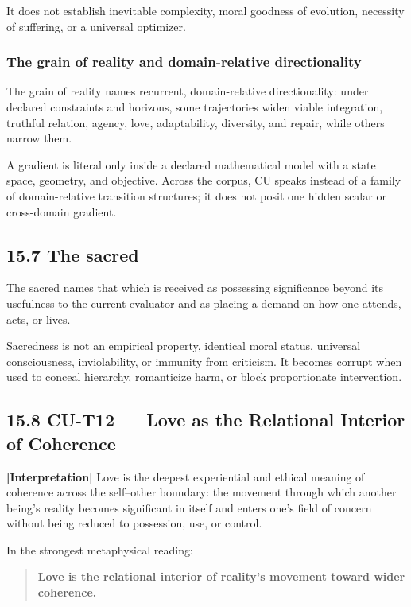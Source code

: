 \documentclass[
  11pt,
]{article}
\begin{document}
It does not establish inevitable complexity, moral goodness of
evolution, necessity of suffering, or a universal optimizer.

\subsubsection{The grain of reality and domain-relative
directionality}\label{the-grain-of-reality-and-domain-relative-directionality}

The grain of reality names recurrent, domain-relative directionality:
under declared constraints and horizons, some trajectories widen viable
integration, truthful relation, agency, love, adaptability, diversity,
and repair, while others narrow them.

A gradient is literal only inside a declared mathematical model with a
state space, geometry, and objective. Across the corpus, CU speaks
instead of a family of domain-relative transition structures; it does
not posit one hidden scalar or cross-domain gradient.

\subsection{15.7 The sacred}\label{the-sacred}

The sacred names that which is received as possessing significance
beyond its usefulness to the current evaluator and as placing a demand
on how one attends, acts, or lives.

Sacredness is not an empirical property, identical moral status,
universal consciousness, inviolability, or immunity from criticism. It
becomes corrupt when used to conceal hierarchy, romanticize harm, or
block proportionate intervention.

\subsection{15.8 CU-T12 --- Love as the Relational Interior of
Coherence}\label{cu-t12-love-as-the-relational-interior-of-coherence}

\textbf{{[}Interpretation{]}} Love is the deepest experiential and
ethical meaning of coherence across the self--other boundary: the
movement through which another being's reality becomes significant in
itself and enters one's field of concern without being reduced to
possession, use, or control.

In the strongest metaphysical reading:

\begin{quote}
\textbf{Love is the relational interior of reality's movement toward
wider coherence.}
\end{quote}
\end{document}
